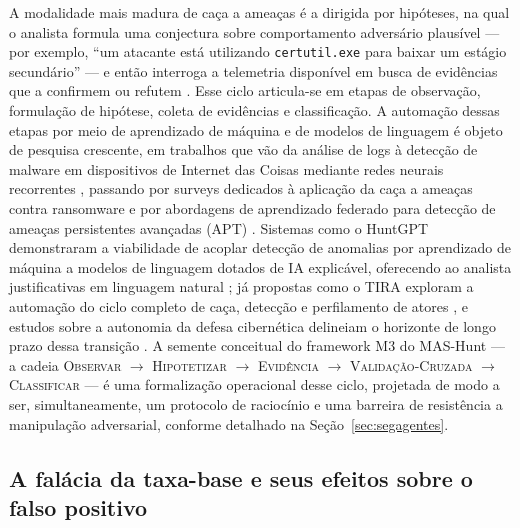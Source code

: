 A modalidade mais madura de caça a ameaças é a dirigida por hipóteses, na qual o analista formula uma conjectura sobre comportamento adversário plausível — por exemplo, ``um atacante está utilizando \texttt{certutil.exe} para baixar um estágio secundário'' — e então interroga a telemetria disponível em busca de evidências que a confirmem ou refutem \cite{10713082}. Esse ciclo articula-se em etapas de observação, formulação de hipótese, coleta de evidências e classificação. A automação dessas etapas por meio de aprendizado de máquina e de modelos de linguagem é objeto de pesquisa crescente, em trabalhos que vão da análise de logs \cite{10616474} à detecção de malware em dispositivos de Internet das Coisas mediante redes neurais recorrentes \cite{HADDADPAJOUH201888}, passando por surveys dedicados à aplicação da caça a ameaças contra ransomware \cite{9791234} e por abordagens de aprendizado federado para detecção de ameaças persistentes avançadas (APT) \cite{9931222}. Sistemas como o HuntGPT demonstraram a viabilidade de acoplar detecção de anomalias por aprendizado de máquina a modelos de linguagem dotados de IA explicável, oferecendo ao analista justificativas em linguagem natural \cite{ali2023huntgptintegratingmachinelearningbased}; já propostas como o TIRA exploram a automação do ciclo completo de caça, detecção e perfilamento de atores \cite{10750987}, e estudos sobre a autonomia da defesa cibernética delineiam o horizonte de longo prazo dessa transição \cite{academia21}. A semente conceitual do framework M3 do MAS-Hunt — a cadeia \textsc{Observar} $\rightarrow$ \textsc{Hipotetizar} $\rightarrow$ \textsc{Evidência} $\rightarrow$ \textsc{Validação-Cruzada} $\rightarrow$ \textsc{Classificar} — é uma formalização operacional desse ciclo, projetada de modo a ser, simultaneamente, um protocolo de raciocínio e uma barreira de resistência a manipulação adversarial, conforme detalhado na Seção~\ref{sec:segagentes}.

\subsection{A falácia da taxa-base e seus efeitos sobre o falso positivo}
\label{subsec:taxabase}

